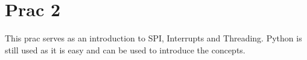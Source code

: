 \section{Prac 2}
This prac serves as an introduction to SPI, Interrupts and Threading. Python is still used as it is easy and can be used to introduce the concepts. 